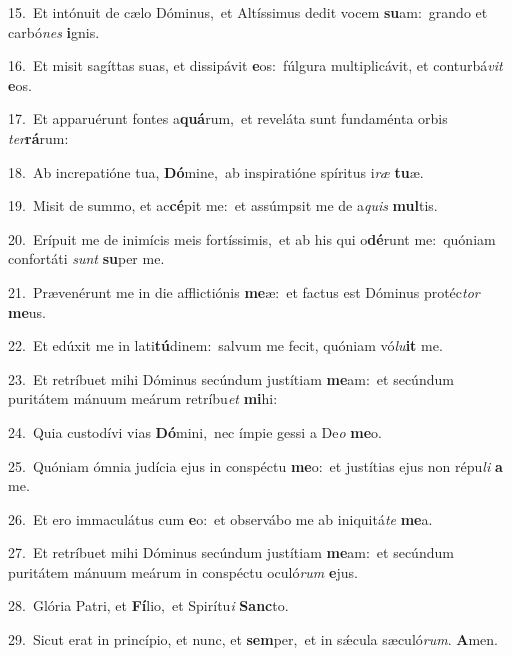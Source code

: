 {\numbfont\textcolor{\numbcolor}{15.}}~Et intónuit de cælo Dóminus,~\dagger et Altíssimus dedit vocem \textbf{su}\-am:~\star grando et carbó\textit{nes} \textbf{i}\-gnis.\par
{\numbfont\textcolor{\numbcolor}{16.}}~Et misit sagíttas suas, et dissipávit \textbf{e}\-os:~\star fúlgura multiplicávit, et conturbá\textit{vit} \textbf{e}\-os.\par
{\numbfont\textcolor{\numbcolor}{17.}}~Et apparuérunt fontes a\-\textbf{quá}\-rum,~\star et reveláta sunt fundaménta orbis \textit{ter}\-\textbf{rá}rum:\par
{\numbfont\textcolor{\numbcolor}{18.}}~Ab increpatióne tua, \textbf{Dó}\-mine,~\star ab inspiratióne spíritus i\textit{ræ} \textbf{tu}\-æ.\par
{\numbfont\textcolor{\numbcolor}{19.}}~Misit de summo, et ac\-\textbf{cé}\-pit me:~\star et assúmpsit me de a\textit{quis} \textbf{mul}\-tis.\par
{\numbfont\textcolor{\numbcolor}{20.}}~Erípuit me de inimícis meis fortíssimis,~\dagger et ab his qui o\-\textbf{dé}\-runt me:~\star quóniam confortáti \textit{sunt} \textbf{su}\-per me.\par
{\numbfont\textcolor{\numbcolor}{21.}}~Prævenérunt me in die afflictiónis \textbf{me}\-æ:~\star et factus est Dóminus protéc\textit{tor} \textbf{me}\-us.\par
{\numbfont\textcolor{\numbcolor}{22.}}~Et edúxit me in lati\-\textbf{tú}\-dinem:~\star salvum me fecit, quóniam vó\-\textit{lu}\-\textbf{it} me.\par
{\numbfont\textcolor{\numbcolor}{23.}}~Et retríbuet mihi Dóminus secúndum justítiam \textbf{me}\-am:~\star et secúndum puritátem mánuum meárum retríbu\textit{et} \textbf{mi}\-hi:\par
{\numbfont\textcolor{\numbcolor}{24.}}~Quia custodívi vias \textbf{Dó}\-mini,~\star nec ímpie gessi a De\textit{o} \textbf{me}\-o.\par
{\numbfont\textcolor{\numbcolor}{25.}}~Quóniam ómnia judícia ejus in conspéctu \textbf{me}\-o:~\star et justítias ejus non répu\textit{li} \textbf{a} me.\par
{\numbfont\textcolor{\numbcolor}{26.}}~Et ero immaculátus cum \textbf{e}\-o:~\star et observábo me ab iniquitá\textit{te} \textbf{me}\-a.\par
{\numbfont\textcolor{\numbcolor}{27.}}~Et retríbuet mihi Dóminus secúndum justítiam \textbf{me}\-am:~\star et secúndum puritátem mánuum meárum in conspéctu oculó\textit{rum} \textbf{e}\-jus.\par
{\numbfont\textcolor{\numbcolor}{28.}}~Glória Patri, et \textbf{Fí}\-lio,~\star et Spirítu\textit{i} \textbf{Sanc}\-to.\par
{\numbfont\textcolor{\numbcolor}{29.}}~Sicut erat in princípio, et nunc, et \textbf{sem}\-per,~\star et in sǽcula sæculó\-\textit{rum}\-. \textbf{A}\-men.\par
